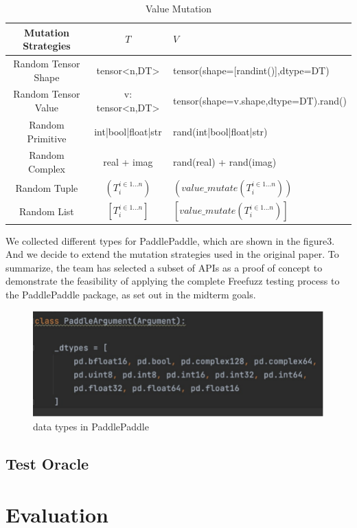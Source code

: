 \documentclass[sigconf]{acmart}
\begin{document}
  \begin{table}[h]
    \centering
    \caption{Value Mutation}
    \label{tab:freq}
    \begin{tabular}{ccl}
      \toprule
      Mutation Strategies&$T$&$V$\\
      \midrule
      Random Tensor Shape& tensor<n,DT>& tensor(shape=[randint()],dtype=DT)\\
      Random Tensor Value& v: tensor<n,DT>& tensor(shape=v.shape,dtype=DT).rand()\\
      Random Primitive& int|bool|float|str & rand(int|bool|float|str)\\
      Random Complex& real + imag & rand(real) + rand(imag)\\
      Random Tuple& $(T_i ^ {i\in 1...n})$&$(value\_mutate(T_i ^ {i\in 1...n}))$ \\
      Random List& $[T_i ^ {i\in 1...n}]$&$[value\_mutate(T_i ^ {i\in 1...n})]$ \\
    \bottomrule
  \end{tabular}
  \end{table}


  We collected different types for PaddlePaddle, which are shown in the figure3. 
  And we decide to extend the mutation strategies used in the original paper.
  To summarize, the team has selected a subset of APIs as a proof of concept to 
  demonstrate the feasibility of applying the complete Freefuzz testing process to the PaddlePaddle package, 
  as set out in the midterm goals.
  \begin{figure}[h]
    \centering
    \includegraphics[width=\linewidth]{4.png}
    \caption{data types in PaddlePaddle}
  \end{figure}


  \subsection{Test Oracle}


\section{Evaluation}
\end{document}
